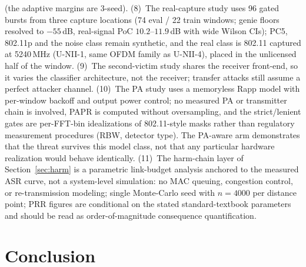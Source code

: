 \documentclass[review]{elsarticle}
\begin{document}
(the adaptive margins are 3-seed).
(8)~The real-capture study uses 96 gated bursts from three capture
locations (74 eval / 22 train windows; genie floors resolved to
$-55$\,dB, real-signal PoC $10.2$--$11.9$\,dB with wide Wilson CIs); PC5, 802.11p and the noise class
remain synthetic, and the real class is 802.11 captured at 5240\,MHz
(U-NII-1, same OFDM family as U-NII-4), placed in the unlicensed half of
the window. (9)~The second-victim study shares the receiver front-end, so
it varies the classifier architecture, not the receiver; transfer attacks
still assume a perfect attacker channel. (10)~The PA study uses a
memoryless Rapp model with per-window backoff and output power control;
no measured PA or transmitter chain is involved, PAPR is computed
without oversampling, and the strict/lenient gates are per-FFT-bin
idealizations of 802.11-style masks rather than regulatory measurement
procedures (RBW, detector type). The PA-aware arm demonstrates that the
threat survives this model class, not that any particular hardware
realization would behave identically. (11)~The harm-chain layer of
Section~\ref{sec:harm} is a parametric link-budget analysis anchored to
the measured ASR curve, not a system-level simulation: no MAC queuing,
congestion control, or re-transmission modeling; single Monte-Carlo seed
with $n=4000$ per distance point; PRR figures are conditional on the
stated standard-textbook parameters and should be read as
order-of-magnitude consequence quantification.

\section{Conclusion}
\label{sec:conclusion}
\end{document}
